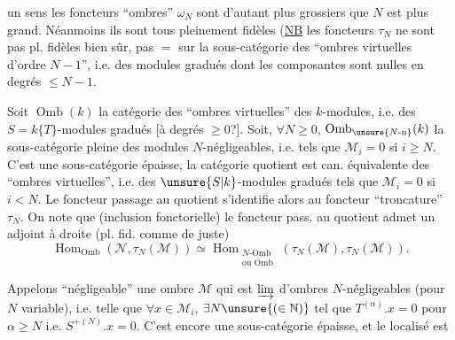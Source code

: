 un sens les foncteurs ``ombres'' $\omega_N$ sont d'autant plus grossiers que $N$ est plus grand. Néanmoins ils sont tous pleinement fidèles (\uline{NB} les foncteurs $\tau_N$ ne sont pas pl. fidèles bien sûr, pas $=$ sur la sous-catégorie des ``ombres virtuelles d'ordre $N-1$'', i.e. des modules gradués dont les composantes sont nulles en degrés $\leq N-1$.

Soit $\operatorname{Omb}(k)$ la catégorie des ``ombres virtuelles'' des $k$-modules, i.e. des $S=k\{T\}$-modules gradués [à degrés $\geq0$?]. Soit, $\forall N\geq0$, $\operatorname{Omb}_{\unsure{N\text{-n}}}(k)$ la sous-catégorie pleine des modules $N$-négligeables, i.e. tels que $\mathcal M_i=0$ si $i\geq N$.
C'est une sous-catégorie épaisse, la catégorie quotient est can. équivalente   des ``ombres virtuelles'', i.e. des $\unsure{S|k}$-modules gradués tels que $\mathcal M_i=0$ si $i<N$.
Le foncteur passage au quotient s'identifie alors au foncteur ``troncature'' $\tau_N$. On note que
(inclusion fonctorielle)  le foncteur  pass. au quotient admet un adjoint à droite (pl. fid. comme de juste)
\[
\operatorname{Hom}_{\operatorname{Omb}}(\mathcal N,\tau_N(\mathcal M))\simeq
\operatorname{Hom}_{\substack{N\text{-Omb}\\\text{ou Omb}}}(\tau_N(\mathcal M),\tau_N(\mathcal M)).
\]

Appelons ``négligeable'' une ombre $\mathcal M$ qui est $\varinjlim$  d'ombres $N$-négligeables (pour $N$ variable), i.e. telle que  $\forall x\in\mathcal M_i$, $\exists N\unsure{(\in\mathbb N)}$ tel que $T^{(\alpha)}.x=0$ pour $\alpha\geq N$ i.e. $S^{+(N)}.x=0$. C'est encore une sous-catégorie épaisse, et le localisé est
